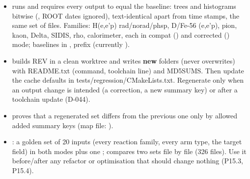 \begin{itemize}
\item {} runs
 and requires every output to equal the
baseline:  trees and histograms bitwise (, ROOT dates ignored),  text-identical apart from time stamps, the same set of files. Families: H(e,e'p)
rad/\allowbreak{}norad/\allowbreak{}phsp,\allowbreak{} D/Fe-56 (e,e'p), pion, kaon, Delta, SIDIS, rho, calorimeter,\allowbreak{} each in compat ()
and corrected () mode; baselines in ,
prefix  (currently ).
\item {} builds REV in a clean worktree and
writes \textbf{new} folders  (never overwrites) with README.txt (command, toolchain line) and MD5SUMS.
Then update the  cache defaults in tests/\allowbreak{}regression/\allowbreak{}CMakeLists.\allowbreak{}txt. Regenerate only when an output change is
intended (a correction, a new summary key) or after a toolchain update (D-044).
\item {} proves that
a regenerated set differs from the previous one only by allowed added summary keys (map file:
).
\item {}: a golden set of 20 inputs (every reaction family, every arm type, the
target field) in both modes plus one ;  compares two sets file by file (326 files). Use it
before/\allowbreak{}after any refactor or optimisation that should change nothing (P15.3, P15.4).
\end{itemize}
